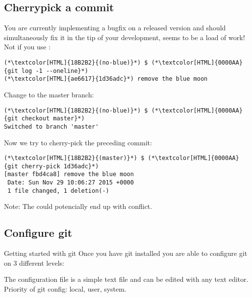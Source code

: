 \subsection{Cherrypick a commit} 
\begin{frame}[fragile] 
    \subslidetitle 
  You are currently implementing a bugfix on a released version and should simultaneously fix it in the tip of your development, seems to be a load of work! Not if you use :
  \begin{lstlisting}
(*\textcolor[HTML]{18B2B2}{(no-blue)}*) $ (*\textcolor[HTML]{0000AA}{git log -1 --oneline}*)
(*\textcolor[HTML]{ae6617}{1d36adc}*) remove the blue moon
\end{lstlisting}
  Change to the master branch:
  \begin{lstlisting}
(*\textcolor[HTML]{18B2B2}{(no-blue)}*) $ (*\textcolor[HTML]{0000AA}{git checkout master}*)
Switched to branch 'master'
\end{lstlisting}
  Now we try to cherry-pick the preceding commit:
  \begin{lstlisting}
(*\textcolor[HTML]{18B2B2}{(master)}*) $ (*\textcolor[HTML]{0000AA}{git cherry-pick 1d36adc}*)
[master fbd4ca8] remove the blue moon
 Date: Sun Nov 29 10:06:27 2015 +0000
 1 file changed, 1 deletion(-)
\end{lstlisting}
  Note:  The  could potencially end up with conflict.
\end{frame}


\subsection{Configure git}
\begin{frame}[fragile]
  \subslidetitle
  \begin{block}{Getting started with git}
    Once you have git installed you are able to configure git on 3 different levels:
    \begin{itemize}
    \end{itemize}

    The configuration file is a simple text file and can be edited with any text editor.
    Priority of git config: local, user, system.
  \end{block}
\end{frame}

